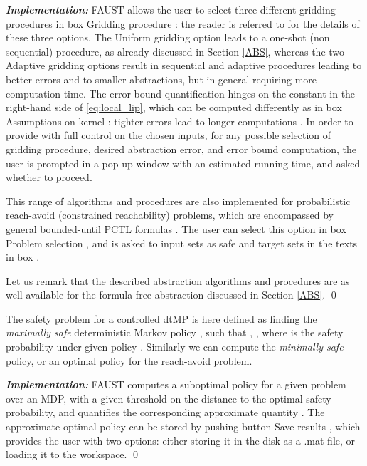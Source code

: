 \documentclass{llncs}
\newcommand*\circled[1]{\tikz[baseline=(char.base)]{\node[shape=circle,draw,inner sep=0.5pt] (char) {#1};}}
\newcommand*\circledb[1]{\tikz[baseline=(char.base)]{\node[shape=circle,draw,inner sep=0.2pt] (char) {#1};}}
\newcommand{\software}{\textsf{FAUST}\xspace}
\newcommand{\boxname}[1]{\textsf{#1}}
\begin{document}
\textit{\textbf{Implementation: }}
\software allows the user to select three different gridding procedures in box \boxname{Gridding procedure} \circled{4}:  
the reader is referred to \cite{SA13} for the details of these three options. 
The \boxname{Uniform gridding} option leads to a one-shot (non sequential) procedure, as already discussed in Section \ref{ABS}, 
whereas the two \boxname{Adaptive gridding} options result in sequential and adaptive procedures leading to better errors and to smaller abstractions,   
but in general requiring more computation time. 
The error bound quantification hinges on the constant in the right-hand side of \eqref{eq:local_lip},  
which can be computed differently as in box \boxname{Assumptions on kernel} \circled{4}: tighter errors lead to longer computations \cite{SA13}. 
In order to provide with full control on the chosen inputs, 
for any possible selection of gridding procedure, desired abstraction error, and error bound computation, 
the user is prompted in a pop-up window with an estimated running time, and asked whether to proceed. 

This range of algorithms and procedures are also implemented for probabilistic reach-avoid (constrained reachability) problems, 
which are encompassed by general bounded-until PCTL formulas . 
The user can select this option in box \boxname{Problem selection} \circled{1}, 
and is asked to input sets  as safe and target sets in the texts in box \circled{8}.

Let us remark that the described abstraction algorithms and procedures are as well available for the formula-free abstraction discussed in Section \ref{ABS}. 
\qed

The safety problem for a controlled dtMP \cite{tmka2013} is here defined as finding the \emph{maximally safe} deterministic Markov policy , 
such that , , 
where  is the safety probability under given policy  . 
Similarly we can compute the \emph{minimally safe} policy, 
or an optimal policy for the reach-avoid problem.  

\textit{\textbf{Implementation: }}
\software computes a suboptimal policy for a given problem over an MDP, 
with a given threshold on the distance to the optimal safety probability, 
and quantifies the corresponding approximate quantity .
The approximate optimal policy can be stored by pushing button \boxname{Save results} \circledb{12}, 
which provides the user with two options: 
either storing it in the disk as a .mat file, 
or loading it to the workspace. 
\qed
\end{document}
